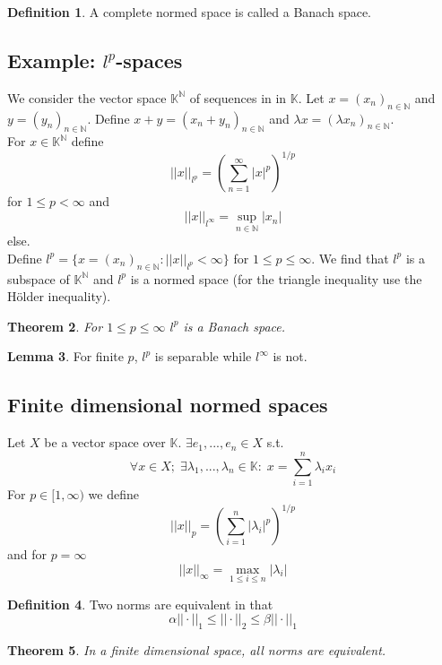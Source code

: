 \documentclass[a4paper, 12pt]{article}
\theoremstyle{plain}
\newtheorem{theorem}{Theorem}[subsection] %
\theoremstyle{definition}
\newtheorem{definition}[theorem]{Definition} %
\theoremstyle{lemma}
\newtheorem{lemma}[theorem]{Lemma}
\theoremstyle{remark}
\theoremstyle{corollary}
\theoremstyle{example}
\begin{document}
	\begin{definition}
		A complete normed space is called a Banach space.
	\end{definition}
	
	\subsection{Example: $l^p$-spaces}
	We consider the vector space $\mathbb{K}^\mathbb{N}$ of sequences in in $\mathbb{K}$. Let $x = (x_n)_{n \in \mathbb{N}}$ and $y = (y_n)_{n \in \mathbb{N}}$. Define $x+y = (x_n+y_n)_{n \in \mathbb{N}}$ and $\lambda x = (\lambda x_n)_{n \in \mathbb{N}}$.\\
	For $x \in \mathbb{K}^\mathbb{N}$ define \[||x||_{l^p} = \left(\sum_{n=1}^\infty \left|x\right|^p\right)^{1/p}\] for $1\leq p < \infty$ and \[||x||_{l^\infty} = \sup\limits_{n \in \mathbb{N}} \left|x_n\right|\] else.\\
	Define $l^p = \{x = (x_n)_{n \in \mathbb{N}}: ||x||_{l^p} < \infty\}$ for $1 \leq p \leq \infty$. We find that $l^p$ is a subspace of $\mathbb{K}^\mathbb{N}$ and $l^p$ is a normed space (for the triangle inequality use the Hölder inequality).
	\begin{theorem}
		For $1 \leq p \leq \infty$ $l^p$ is a Banach space.
	\end{theorem}
	\begin{lemma}
		For finite $p$, $l^p$ is separable while $l^\infty$ is not.
	\end{lemma}
	
	\subsection{Finite dimensional normed spaces}
	Let $X$ be a vector space over $\mathbb{K}$. $\exists e_1,...,e_n \in X$ s.t. \[\forall x \in X; \; \exists \lambda_1,...,\lambda_n \in \mathbb{K}: \; x = \sum_{i=1}^n \lambda_i x_i\]
	For $p \in [1,\infty)$ we define \[||x||_p = \left(\sum_{i=1}^n \left|\lambda_i\right|^p\right)^{1/p}\] and for $p = \infty$ \[||x||_\infty = \max\limits_{1 \leq i \leq n} \left|\lambda_i\right|\]
	
	\begin{definition}
		Two norms are equivalent in that \[\alpha ||\cdot ||_1 \leq ||\cdot ||_2 \leq \beta ||\cdot ||_1\]
	\end{definition}
	
	\begin{theorem}
		In a finite dimensional space, all norms are equivalent.
	\end{theorem}
	
\end{document}
